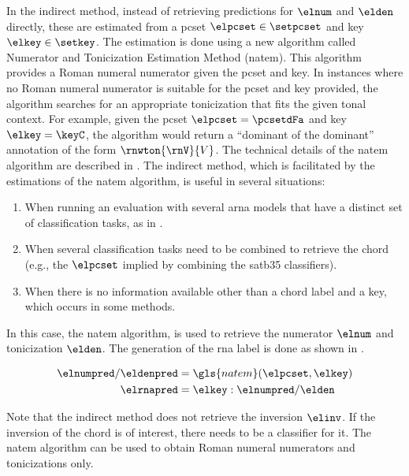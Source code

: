

In the indirect method, instead of retrieving predictions
for $\elnum$ and $\elden$ directly, these are estimated from
a \gls{pcset} $\elpcset \in \setpcset$ and key $\elkey \in
\setkey$. The estimation is done using a new algorithm
called Numerator and Tonicization Estimation Method
(\gls{natem}). This algorithm provides a Roman numeral
numerator given the \gls{pcset} and key. In instances where
no Roman numeral numerator is suitable for the \gls{pcset}
and key provided, the algorithm searches for an appropriate
tonicization that fits the given tonal context. For example,
given the \gls{pcset} $\elpcset = \pcsetdFa$ and key $\elkey
= \keyC$, the algorithm would return a ``dominant of the
dominant'' annotation of the form $\rnwton{\rnV}{V}$. The
technical details of the \gls{natem} algorithm are described
in . The
indirect method, which is facilitated by the estimations of
the \gls{natem} algorithm, is useful in several situations: 

\begin{enumerate}
    \item When running an evaluation with several \gls{arna}
    models that have a distinct set of classification tasks,
    as in .
    \item When several classification tasks need to be
    combined to retrieve the chord (e.g., the $\elpcset$
    implied by combining the \gls{satb35} classifiers).
    \item When there is no information available other than
    a chord label and a key, which occurs in some methods.
\end{enumerate}

In this case, the \gls{natem} algorithm, is used to retrieve
the numerator $\elnum$ and tonicization $\elden$. The
generation of the \gls{rna} label is done as shown in
.

\begin{equation}
    \label{eq:rna_indirect}
    \begin{split}
        \elnumpred / \eldenpred &= \gls{natem}(\elpcset, \elkey) \\
        \elrnapred &= \elkey : \elnumpred / \elden 
    \end{split}
\end{equation}

Note that the indirect method does not retrieve the
inversion $\elinv$. If the inversion of the chord is of
interest, there needs to be a classifier for it. The
\gls{natem} algorithm can be used to obtain Roman numeral
numerators and tonicizations only. 


